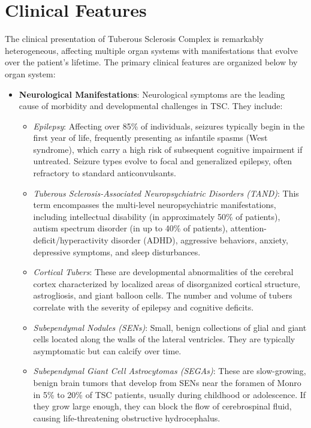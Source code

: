 \section*{Clinical Features}
The clinical presentation of Tuberous Sclerosis Complex is remarkably heterogeneous, affecting multiple organ systems with manifestations that evolve over the patient's lifetime. The primary clinical features are organized below by organ system:
\begin{itemize}
    \item \textbf{Neurological Manifestations}: Neurological symptoms are the leading cause of morbidity and developmental challenges in TSC. They include:
    \begin{itemize}
        \item \textit{Epilepsy}: Affecting over 85\% of individuals, seizures typically begin in the first year of life, frequently presenting as infantile spasms (West syndrome), which carry a high risk of subsequent cognitive impairment if untreated. Seizure types evolve to focal and generalized epilepsy, often refractory to standard anticonvulsants.
        \item \textit{Tuberous Sclerosis-Associated Neuropsychiatric Disorders (TAND)}: This term encompasses the multi-level neuropsychiatric manifestations, including intellectual disability (in approximately 50\% of patients), autism spectrum disorder (in up to 40\% of patients), attention-deficit/hyperactivity disorder (ADHD), aggressive behaviors, anxiety, depressive symptoms, and sleep disturbances.
        \item \textit{Cortical Tubers}: These are developmental abnormalities of the cerebral cortex characterized by localized areas of disorganized cortical structure, astrogliosis, and giant balloon cells. The number and volume of tubers correlate with the severity of epilepsy and cognitive deficits.
        \item \textit{Subependymal Nodules (SENs)}: Small, benign collections of glial and giant cells located along the walls of the lateral ventricles. They are typically asymptomatic but can calcify over time.
        \item \textit{Subependymal Giant Cell Astrocytomas (SEGAs)}: These are slow-growing, benign brain tumors that develop from SENs near the foramen of Monro in 5\% to 20\% of TSC patients, usually during childhood or adolescence. If they grow large enough, they can block the flow of cerebrospinal fluid, causing life-threatening obstructive hydrocephalus.
    \end{itemize}

\end{itemize}
